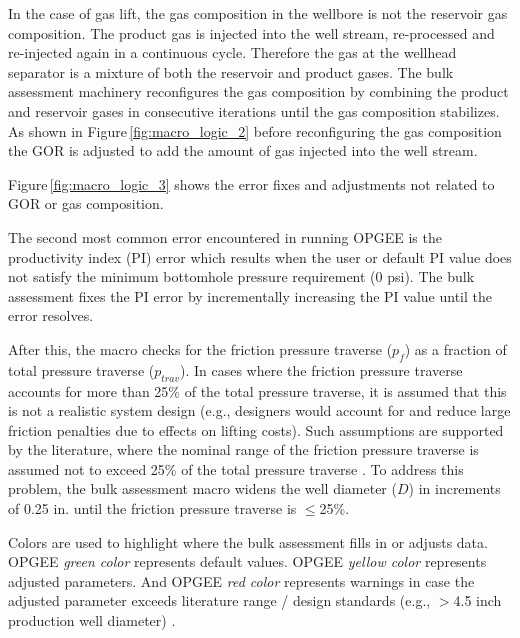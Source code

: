 \documentclass[11pt]{report}
\begin{document}
In the case of gas lift, the gas composition in the wellbore is not the reservoir gas composition. The product gas is injected into the well stream, re-processed and re-injected again in a continuous cycle. Therefore the gas at the wellhead separator is a mixture of both the reservoir and product gases. The bulk assessment machinery reconfigures the gas composition by combining the product and reservoir gases in consecutive iterations until the gas composition stabilizes. As shown in Figure\,\ref{fig:macro_logic_2} before reconfiguring the gas composition the GOR is adjusted to add the amount of gas injected into the well stream.\par

Figure\,\ref{fig:macro_logic_3} shows the error fixes and adjustments not related to GOR or gas composition. 

The second most common error encountered in running OPGEE is the productivity index (PI) error which results when the user or default PI value does not satisfy the minimum bottomhole pressure requirement (0 psi). The bulk assessment fixes the PI error by incrementally increasing the PI value until the error resolves. 

After this, the macro checks for the friction pressure traverse ($p_f$) as a fraction of total pressure traverse ($p_{trav}$). In cases where the friction pressure traverse accounts for more than 25\% of the total pressure traverse, it is assumed that this is not a realistic system design (e.g., designers would account for and reduce large friction penalties due to effects on lifting costs). Such assumptions are supported by the literature, where the nominal range of the friction pressure traverse is assumed not to exceed 25\% of the total pressure traverse \cite{Takacs2005}. To address this problem, the bulk assessment macro widens the well diameter ($D$) in increments of 0.25 in. until the friction pressure traverse is $\leq$25\%. 

Colors are used to highlight where the bulk assessment fills in or adjusts data. OPGEE \textit{green color} represents default values. OPGEE \textit{yellow color} represents adjusted parameters. And OPGEE \textit{red color} represents warnings in case the adjusted parameter exceeds literature range / design standards (e.g., $>$4.5 inch production well diameter) \cite[p. 106]{Clegg2007}.




\end{document}
